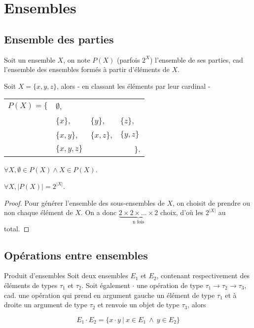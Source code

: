 \section{Ensembles}

\subsection{Ensemble des parties}

Soit un ensemble $X$, on note $P(X)$ (parfois $2^X$) l'ensemble de ses parties, cad l'ensemble des ensembles formés à partir d'éléments de $X$.

\begin{example}
Soit $X = \{x,y,z\}$, alors - en classant les éléments par leur cardinal -

\begin{tabular}{llll}
 $P(X) = \{$ & $\emptyset$, & & \\
& $\{x\}$,&$\{y\}$,&$\{z\}$,\\
&$\{x,y\}$,& $\{x,z\}$,&$\{y,z\}$\\
& $\{x,y,z\}$ & &$~~~~~~~~\}$.
\end{tabular}
\end{example}

\begin{lemma}
$\forall X, \emptyset \in P(X) \wedge X \in P(X)$.
\end{lemma}

\begin{lemma}
$\forall X, |P(X)| = 2^{|X|}$.
\end{lemma}

\begin{proof}
Pour générer l'ensemble des sous-ensembles de $X$, on choisit de prendre ou non chaque élément de $X$. On a donc $\underbrace{2 \times 2 \times ... \times 2}_{\textrm{n fois}}$ choix, d'où les $2^{|X|}$ au total.
\end{proof}

\subsection{Opérations entre ensembles}

\begin{definition}{Produit d'ensembles}{}
\label{ensprod}
Soit deux ensembles $E_1$ et $E_2$, contenant respectivement des éléments de types $\tau_1$ et $\tau_2$. Soit également $\cdot$ une opération de type $\tau_1 \rightarrow \tau_2 \rightarrow \tau_3$, cad. une opération qui prend en argument gauche un élément de type $\tau_1$ et à droite un argument de type $\tau_2$ et renvoie un objet de type $\tau_3$, alors 

\[
E_1 \cdot E_2 = \{x \cdot y~|~x \in E_1~\wedge~y \in E_2\}
\]
\end{definition}

